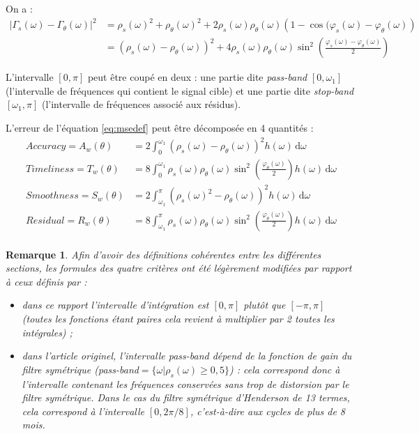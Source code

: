 \documentclass[
  11pt,
  french,
  a4paper]{article}
\newcommand\1{\mathds{1}}
\newcommand\ud{\,\mathrm{d}}
\newtheorem*{remarque}{Remarque}
\begin{document}
On a :
\begin{align}
\left|\Gamma_s(\omega)-\Gamma_\theta(\omega)\right|^{2} & =\rho_s(\omega)^{2}+\rho_\theta(\omega)^{2}+2\rho_s(\omega)\rho_\theta(\omega)\left(1-\cos(\varphi_s(\omega)-\varphi_\theta(\omega)\right) \nonumber\\
 & =\left(\rho_s(\omega)-\rho_\theta(\omega)\right)^{2}+4\rho_s(\omega)\rho_\theta(\omega)\sin^{2}\left(\frac{\varphi_s(\omega)-\varphi_\theta(\omega)}{2}\right)
 \label{eq:msedecomp}
\end{align}

L'intervalle \([0,\pi]\) peut être coupé en deux : une partie dite \emph{pass-band} \([0,\omega_1]\) (l'intervalle de fréquences qui contient le signal cible) et une partie dite \emph{stop-band} \([\omega_1,\pi]\) (l'intervalle de fréquences associé aux résidus).

L'erreur de l'équation \eqref{eq:msedef} peut être décomposée en 4 quantités :
\begin{align*}
Accuracy =A_w(\theta)&= 2\int_0^{\omega_1}\left(\rho_s(\omega)-\rho_\theta(\omega)\right)^{2}h(\omega)\ud\omega\\
Timeliness =T_w(\theta)&= 8\int_0^{\omega_1}\rho_s(\omega)\rho_\theta(\omega)\sin^{2}\left(\frac{\varphi_\theta(\omega)}{2}\right)h(\omega)\ud\omega\\
Smoothness =S_w(\theta)&= 2\int_{\omega_1}^\pi\left(\rho_s(\omega)^{2}-\rho_\theta(\omega)\right)^{2}h(\omega)\ud\omega\\
Residual =R_w(\theta)&= 8\int_{\omega_1}^\pi\rho_s(\omega)\rho_\theta(\omega)\sin^{2}\left(\frac{\varphi_\theta(\omega)}{2}\right)h(\omega)\ud\omega\\
\end{align*}

\begin{remarque}

Afin d'avoir des définitions cohérentes entre les différentes sections, les formules des quatre critères ont été légèrement modifiées par rapport à ceux définis par \textcite{trilemmaWMR2019} :

\begin{itemize}
\item
  dans ce rapport l'intervalle d'intégration est \([0,\pi]\) plutôt que \([-\pi,\pi]\) (toutes les fonctions étant paires cela revient à multiplier par 2 toutes les intégrales) ;
\item
  dans l'article originel, l'intervalle pass-band dépend de la fonction de gain du filtre symétrique (pass-band\(=\{\omega |\rho_s(\omega)\geq 0,5\}\)) : cela correspond donc à l'intervalle contenant les fréquences conservées sans trop de distorsion par le filtre symétrique.
  Dans le cas du filtre symétrique d'Henderson de 13 termes, cela correspond à l'intervalle \([0, 2\pi/8]\), c'est-à-dire aux cycles de plus de 8 mois.
\end{itemize}

\end{remarque}
\end{document}
